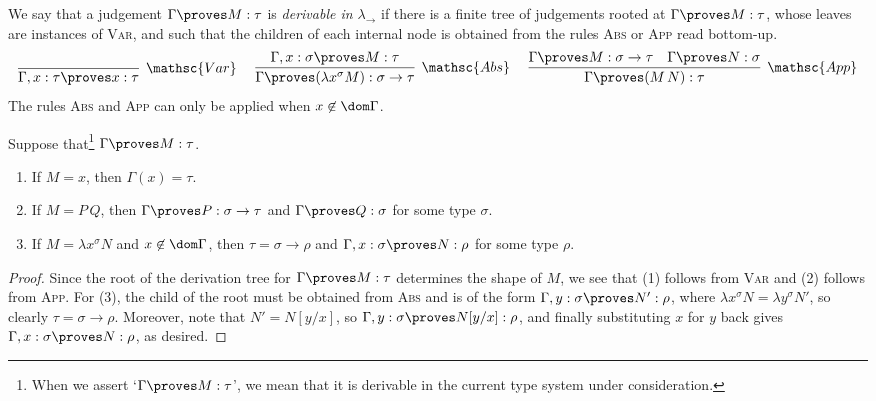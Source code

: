 \documentclass[reqno]{amsart}
\begin{document}
    \begin{definition}
        We say that a judgement $\Gamma\proves M:\tau$ is \textit{derivable in $\lambda_\rightarrow$} if there is a finite tree of judgements rooted at $\Gamma\proves M:\tau$, whose leaves are instances of \textsc{Var}, and such that the children of each internal node is obtained from the rules \textsc{Abs} or \textsc{App} read bottom-up.
        \begin{equation*}
            \infer[\mathsc{Var}]{\Gamma,x:\tau\proves x:\tau}{}\ \ \ \ 
            \infer[\mathsc{Abs}]{\Gamma\proves(\lambda x^\sigma M):\sigma\rightarrow\tau}{\Gamma,x:\sigma\proves M:\tau}\ \ \ \ 
            \infer[\mathsc{App}]{\Gamma\proves(M\,N):\tau}{
                \Gamma\proves M:\sigma\rightarrow\tau &
                \Gamma\proves N:\sigma
            }
        \end{equation*}
        The rules \textsc{Abs} and \textsc{App} can only be applied when $x\not\in\dom\Gamma$.
    \end{definition}

    \begin{lemma}\label{lem:simply_typed_generation}
        Suppose that\footnote{When we assert `$\Gamma\proves M:\tau$', we mean that it is derivable in the current type system under consideration.} $\Gamma\proves M:\tau$.
        \begin{enumerate}
            \item If $M=x$, then $\Gamma(x)=\tau$.
            \item If $M=P\,Q$, then $\Gamma\proves P:\sigma\rightarrow\tau$ and $\Gamma\proves Q:\sigma$ for some type $\sigma$.
            \item If $M=\lambda x^\sigma N$ and $x\not\in\dom\Gamma$, then $\tau=\sigma\rightarrow\rho$ and $\Gamma,x:\sigma\proves N:\rho$ for some type $\rho$.
        \end{enumerate}
    \end{lemma}
    \begin{proof}
        Since the root of the derivation tree for $\Gamma\proves M:\tau$ determines the shape of $M$, we see that (1) follows from \textsc{Var} and (2) follows from \textsc{App}. For (3), the child of the root must be obtained from \textsc{Abs} and is of the form $\Gamma,y:\sigma\proves N':\rho$, where $\lambda x^\sigma N=\lambda y^\sigma N'$, so clearly $\tau=\sigma\rightarrow\rho$. Moreover, note that $N'=N[y/x]$, so $\Gamma,y:\sigma\proves N[y/x]:\rho$, and finally substituting $x$ for $y$ back gives $\Gamma,x:\sigma\proves N:\rho$, as desired.
    \end{proof}
\end{document}
